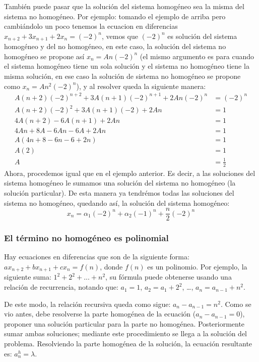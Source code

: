 \documentclass{article}
\begin{document}
También puede pasar que la solución del sistema homogéneo sea la misma del sistema no homogéneo. Por ejemplo: tomando el ejemplo de arriba pero cambiándolo un poco tenemos la ecuacion en diferencias $x_{n+2}+3x_{n+1}+2x_n=(-2)^n$, vemos que $(-2)^n$ es solución del sistema homogéneo y del no homogéneo, en este caso, la solución del sistema no homogéneo se propone así $x_n=An(-2)^n$ (el mismo argumento es para cuando el sistema homogéneo tiene un sola solución y el sistema no homogéneo tiene la misma solución, en ese caso la solución de sistema no homogéneo se propone como $x_n=An^2(-2)^n$), y al resolver queda la siguiente manera:
\begin{align*}
  A(n+2)(-2)^{n+2}+3A(n+1)(-2)^{n+1}+2An(-2)^n&=(-2)^n\\
  A(n+2)(-2)^2+3A(n+1)(-2)+2An&=1\\
  4A(n+2)-6A(n+1)+2An&=1\\
  4An+8A-6An-6A+2An&=1\\
  A(4n+8-6n-6+2n)&=1\\
  A(2)&=1\\
  A&=\frac{1}{2}
\end{align*}
Ahora, procedemos igual que en el ejemplo anterior. Es decir, a las soluciones del sistema homogéneo le sumamos una solución del sistema no homogéneo (la solución particular). De esta manera ya tendrémos todas las soluciones del sistema no homogéneo, quedando así, la solución del sistema homogéneo:
$$x_n=\alpha_1(-2)^n+\alpha_2(-1)^n+\frac{n}{2}(-2)^n$$
\subsubsection{El término no homogéneo es polinomial}
\label{sec:polinomial}

Hay ecuaciones en diferencias que son de la siguiente forma: $ax_{n+2}+bx_{n+1}+cx_n=f(n)$, donde $f(n)$ es un polinomio. Por ejemplo, la siguiente suma: $1^2+2^2+...+n^2$, su fórmula puede obtenerse usando una relación de recurrencia, notando que:
$a_1=1$, $a_2=a_1+2^2$, \dots, $a_n=a_{n-1}+n^2$.


De este modo, la relación recursiva queda como sigue:
$a_{n}-a_{n-1}=n^2$.  Como se vio antes, debe resolverse la parte
homogénea de la ecuación ($a_n-a_{n-1}=0$), proponer una solución
particular para la parte no homogénea. Posteriormente sumar ambas
soluciones; mediante este procedimiento se llega a la solución del problema.
Resolviendo la parte homogénea de la solución, la ecuación resultante
es: $a^h_n=\lambda$.
\end{document}
